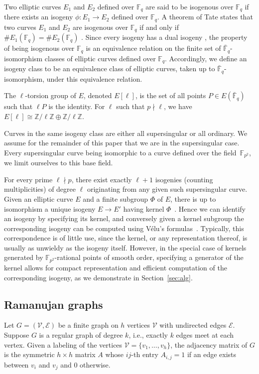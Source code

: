 \documentclass[jmc]{degruyter-journal-a}
\theoremstyle{definition}
\newcommand{\ZZ}{{\mathbb{Z}}}
\newcommand{\FF}{{\mathbb{F}}}
\newcommand{\VV}{{\mathcal{V}}}
\newcommand{\EE}{{\mathcal{E}}}
\begin{document}
Two elliptic curves $E_1$ and $E_2$ defined over $\FF_q$ are said to
be isogenous over $\FF_q$ if there exists an isogeny $\phi\colon E_1
\to E_2$ defined over $\FF_q$. A theorem of Tate states that
two curves $E_1$ and $E_2$ are isogenous over $\FF_q$ if and only if
$\#E_1(\FF_q) = \#E_2(\FF_q)$ \cite[$\S$3]{Tate}. Since every isogeny
has a dual isogeny \cite[III.6.1]{Sil}, the property of being
isogenous over $\FF_q$ is an equivalence relation on the finite set of
$\bar{\FF}_q$-isomorphism classes of elliptic curves defined over
$\FF_q$.  Accordingly, we define an isogeny class to be an equivalence
class of elliptic curves, taken up to $\bar{\FF}_q$-isomorphism, under
this equivalence relation.

The $\ell$-torsion group of $E$, denoted $E[\ell]$, is the set of all
points $P \in E(\bar{\FF}_q)$ such that $\ell P$ is the identity. For
$\ell$ such that $p\nmid \ell$, we have $E[\ell] \cong \ZZ/\ell\ZZ \oplus
\ZZ/\ell\ZZ.$

Curves in the same isogeny class are either all supersingular or all
ordinary. 
We assume for the remainder of this paper that
we are in the supersingular case. Every supersingular curve being
isomorphic to a curve defined over the field~$\FF_{p^2}$, we limit
ourselves to this base field.

For every
prime $\ell \nmid p$, there exist exactly $\ell+1$ isogenies (counting
multiplicities) of degree $\ell$ originating from any given such
supersingular curve.
Given an elliptic curve $E$ and a finite subgroup $\Phi$ of $E$, there
is up to isomorphism a unique isogeny $E \to E'$ having kernel
$\Phi$~\cite[III.4.12]{Sil}. Hence we can identify an isogeny by
specifying its kernel, and conversely given a kernel subgroup the
corresponding isogeny can be computed using V\'elu's
formulas~\cite{Velu}. Typically, this correspondence is of little use,
since the kernel, or any representation thereof, is usually as
unwieldy as the isogeny itself. However, in the special case of
kernels generated by $\FF_{p^2}$-rational points of smooth order,
specifying a generator of the kernel allows for compact representation
and efficient computation of the corresponding isogeny, as we
demonstrate in Section~\ref{sec:alg}.


\subsection{Ramanujan graphs}\label{ram_graph} 

Let $G = (\mathcal{V},\EE)$ be a finite graph on $h$ vertices $\VV$
with undirected edges $\EE$.  Suppose $G$ is a regular graph of degree
$k$, i.e., exactly $k$ edges meet at each vertex. Given a
labeling of the vertices $\VV = \{v_1,\ldots , v_h\}$, the adjacency
matrix of $G$ is the symmetric $h\times h$ matrix $A$ whose $ij$-th
entry $A_{i,j} = 1$ if an edge exists between $v_i$ and $v_j$ and 0
otherwise.
\end{document}
